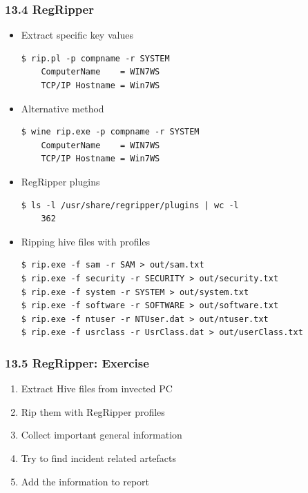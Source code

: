 \begin{frame}[fragile]
  \frametitle{13.4 RegRipper}
  \begin{itemize}
      \item Extract specific key values
  \begin{lstlisting}[basicstyle=\tiny]
$ rip.pl -p compname -r SYSTEM
	ComputerName    = WIN7WS
	TCP/IP Hostname = Win7WS
  \end{lstlisting}
      \item Alternative method
  \begin{lstlisting}[basicstyle=\tiny]
$ wine rip.exe -p compname -r SYSTEM
	ComputerName    = WIN7WS
	TCP/IP Hostname = Win7WS
  \end{lstlisting}
      \item RegRipper plugins
  \begin{lstlisting}[basicstyle=\tiny]
$ ls -l /usr/share/regripper/plugins | wc -l
	362
  \end{lstlisting}
      \item Ripping hive files with profiles
  \begin{lstlisting}[basicstyle=\tiny]
$ rip.exe -f sam -r SAM > out/sam.txt
$ rip.exe -f security -r SECURITY > out/security.txt
$ rip.exe -f system -r SYSTEM > out/system.txt
$ rip.exe -f software -r SOFTWARE > out/software.txt
$ rip.exe -f ntuser -r NTUser.dat > out/ntuser.txt
$ rip.exe -f usrclass -r UsrClass.dat > out/userClass.txt
  \end{lstlisting}
  \end{itemize}
\end{frame}


\begin{frame}[fragile]
  \frametitle{13.5 RegRipper: Exercise}
  \begin{enumerate}
      \item Extract Hive files from invected PC
      \item Rip them with RegRipper profiles
      \item Collect important general information
      \item Try to find incident related artefacts
      \item Add the information to report
  \end{enumerate}
\end{frame}


